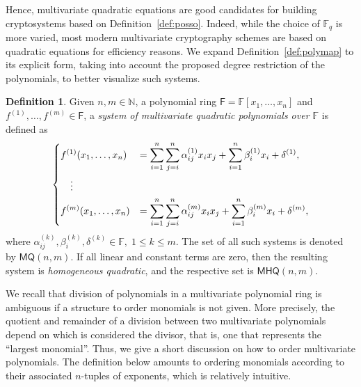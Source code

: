 \documentclass[12pt, a4paper, oneside]{memoir}
\theoremstyle{definition}
\newtheorem{definition}[theorem]{Definition}
\begin{document}
Hence, multivariate quadratic equations are good candidates for building cryptosystems based on Definition~\ref{def:posso}. Indeed, while the choice of $\mathbb{F}_{q}$ is more varied, most modern multivariate cryptography schemes are based on quadratic equations for efficiency reasons. We expand Definition~\ref{def:polymap} to its explicit form, taking into account the proposed degree restriction of the polynomials, to better visualize such systems.

\begin{definition}\label{def:quadsys}
  Given $n, m \in \mathbb{N}$, a polynomial ring $\mathsf{F} = \mathbb{F}[x_{1}, \dots, x_{n}]$ and $f^{(1)}, \dots, f^{(m)} \in \mathsf{F}$, a \emph{system of multivariate quadratic polynomials over $\mathbb{F}$} is defined as
  \begin{align}
    \begin{split}
      \begin{dcases}
        f^{(1)}(x_{1}, \dots, x_{n}) &= 
          \sum_{i = 1}^{n} \sum_{j = i}^{n} \alpha_{ij}^{(1)} x_{i} x_{j}
            + \sum_{i = 1}^{n} \beta_{i}^{(1)} x_{i} + \delta^{(1)}, \\
        \quad \vdots \\
        f^{(m)}(x_{1}, \dots, x_{n}) &= 
          \sum_{i = 1}^{n} \sum_{j = i}^{n} \alpha_{ij}^{(m)} x_{i} x_{j}
            + \sum_{i = 1}^{n} \beta_{i}^{(m)} x_{i} + \delta^{(m)},
      \end{dcases}
    \end{split}
  \end{align}
  where $\alpha_{ij}^{(k)}, \beta_{i}^{(k)}, \delta^{(k)} \in \mathbb{F},\; 1 \leq k \leq m$. The set of all such systems is denoted by $\mathsf{MQ}(n, m)$. If all linear and constant terms are zero, then the resulting system is \emph{homogeneous quadratic}, and the respective set is $\mathsf{MHQ}(n, m)$.
\end{definition}

We recall that division of polynomials in a multivariate polynomial ring is ambiguous if a structure to order monomials is not given. More precisely, the quotient and remainder of a division between two multivariate polynomials depend on which is considered the divisor, that is, one that represents the ``largest monomial''. Thus, we give a short discussion on how to order multivariate polynomials. The definition below amounts to ordering monomials according to their associated $n$-tuples of exponents, which is relatively intuitive. 
\end{document}
